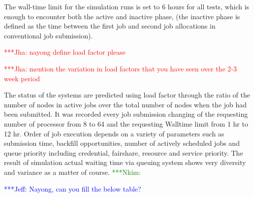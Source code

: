 \documentclass[conference,final]{IEEEtran}
\newcommand{\jhanote}[1]{ {\textcolor{red} { ***Jha: #1 }}}
\newcommand{\Nkimnote}[1]{ {\textcolor{green} { ***Nkim: #1 }}}
\newcommand{\skonote}[1]{ {\textcolor{blue} { ***Jeff: #1 }}}
\newcommand{\jhanote}[1]{}
\newcommand{\Nkimnote}[1]{}
\newcommand{\skonote}[1]{}
\begin{document}
The wall-time limit for the simulation runs is set to 6 hours for all
tests, which is enough to encounter both the active and inactive
phase, (the inactive phase is defined as the time between the first
job and second job allocations in conventional job submission).

\jhanote{nayong define load factor please}

\jhanote{mention the variation in load factors that you have seen over
  the 2-3 week period}
  

The status of the systems are predicted using load factor through the ratio of the number of nodes in active jobs over the total number of nodes when the job had been submitted. It was recorded every job submission changing of the requesting number of processor from 8 to 64 and the requesting Walltime limit from 1 hr to 12 hr. Order of job execution depends on a variety of parameters such as submission time, backfill opportunities, number of actively scheduled jobs and queue priority including credential, fairshare, resource and service priority. The result of simulation actual waiting time via queuing system shows very diversity and variance as a matter of course. 
\Nkimnote{}


\skonote{Nayong, can you fill the below table?}
\end{document}

